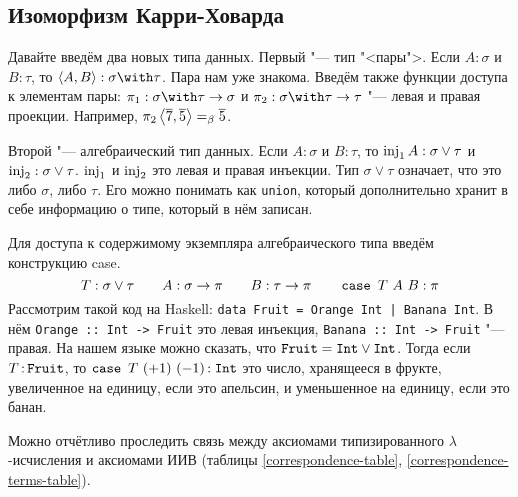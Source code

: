 \subsection{\texorpdfstring{Изоморфизм Карри-Ховарда}{Curry-Howard correspondence}}

Давайте введём два новых типа данных.
Первый "--- тип "<пары">. Если $A : \sigma$ и $B : \tau$, то $\pair{A}{B} : \sigma \with \tau$. Пара нам уже знакома.
Введём также функции доступа к элементам пары: $\pi_1 : \sigma\with\tau\rightarrow\sigma$ и $\pi_2 : \sigma\with\tau\rightarrow\tau$
"--- левая и правая проекции.
Например, $\pi_2 \left<\overline 7,\overline 5\right> =_\beta \overline 5$.

Второй "--- алгебраический тип данных. Если $A : \sigma$ и $B : \tau$, то $\operatorname{inj}_1 A : \sigma \vee \tau$ и $\operatorname{inj}_2 : \sigma \vee \tau$.
$\operatorname{inj}_1$ и $\operatorname{inj}_2$ это левая и правая инъекции.
Тип $\sigma \vee \tau$ означает, что это либо $\sigma$, либо $\tau$.
Его можно понимать как \texttt{union}, который дополнительно хранит в себе информацию о типе, который в нём записан.

Для доступа к содержимому экземпляра алгебраического типа введём конструкцию case.
\[
T : \sigma \vee \tau \qquad A : \sigma \rightarrow \pi \qquad B : \tau \rightarrow \pi \qquad \mathinner{\mathtt{case}}~T~A~B : \pi
\]
Рассмотрим такой код на Haskell: \texttt{data Fruit = Orange Int | Banana Int}.
В нём \texttt{Orange :: Int -> Fruit} это левая инъекция, \texttt{Banana :: Int -> Fruit} "--- правая.
На нашем языке можно сказать, что $\mathinner\mathtt{Fruit} = \mathinner{\mathtt{Int}} \vee \mathinner{\mathtt{Int}}$.
Тогда если $T \mathinner{:} \mathtt{Fruit}$, то $\mathinner{\mathtt{case}}~T~(+1)~(-1) \mathinner{:} \mathrel{\mathtt{Int}}$ это число,
хранящееся в фрукте, увеличенное на единицу, если это апельсин, и уменьшенное на единицу, если это банан.

Можно отчётливо проследить связь между аксиомами типизированного $\lambda$-исчисления и аксиомами ИИВ
(таблицы \ref{correspondence-table}, \ref{correspondence-terms-table}).


